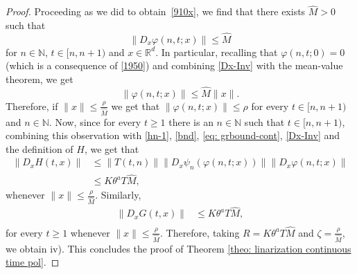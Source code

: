 \documentclass[10pt,a4paper]{amsart}
\def\N{\mathbb{N}}
\def\R{\mathbb{R}}
\renewcommand{\phi}{\varphi}
\begin{document}
\begin{proof}
Proceeding as we did to obtain~\eqref{910x}, we find that there exists $\hat M>0$ such that
\begin{equation}\label{Dx-Inv}
\|D_x\phi(n,t;x) \| \le  \hat M
\end{equation}
for $n\in \N$, $t\in [n, n+1)$ and $x\in \R^d$. In particular, recalling that $\varphi(n,t;0)=0$ (which is a consequence of \eqref{1950}) and combining \eqref{Dx-Inv} with the mean-value theorem, we get
\begin{equation}\label{bx1}
\|\phi(n,t;x) \| \le \hat M  \|x\|.
\end{equation}
Therefore, if $\|x\|\leq \frac{ \rho}{\hat M}$ we get that $\|\phi(n,t;x) \| \leq \rho$ for every $t\in[n,n+1)$ and $n\in \N$. Now, since for every
$t\ge 1$ there is an $n\in\mathbb{N}$ such that $t\in [n,n+1)$, combining this observation with \eqref{hn-1}, \eqref{bnd}, \eqref{eq: grbound-cont}, \eqref{Dx-Inv} and the definition of $H$, we get that 
\[
\begin{split}
\|D_xH(t,x)\|&\leq\|T(t,n)\| \|D_x\psi_n (\phi(n, t;x))\|\|D_x\phi(n, t;x)\|\\
&\leq K \theta^a T  \hat M,
\end{split}
\]
whenever $\|x\|\leq \frac{\rho}{\hat M }$. Similarly,
\[
\begin{split}
\|D_xG(t,x)\|&\leq K \theta^a T  \hat M,\\
\end{split}
\]
for every $t\geq 1$ whenever $\|x\|\leq \frac{ \rho}{\hat M }$. Therefore, taking $R=K \theta^a T  \hat M$ and $\zeta =\frac{\rho}{\hat M}$, we obtain iv). This concludes the proof of Theorem \ref{theo: linarization continuous time pol}.
\end{proof}
\end{document}
